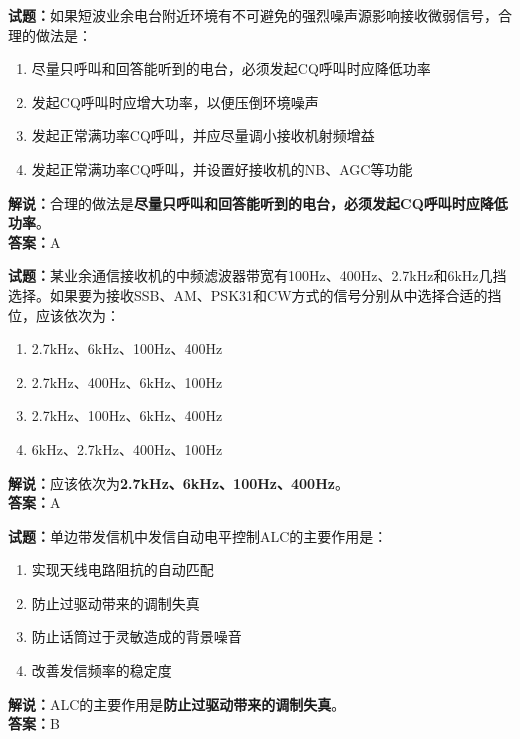 \documentclass{ctexbook}
\begin{document}
\vspace{1em}

\textbf{试题：}如果短波业余电台附近环境有不可避免的强烈噪声源影响接收微弱信号，合理的做法是：
\begin{enumerate}[leftmargin=3em]
  \item 尽量只呼叫和回答能听到的电台，必须发起CQ呼叫时应降低功率
  \item 发起CQ呼叫时应增大功率，以便压倒环境噪声
  \item 发起正常满功率CQ呼叫，并应尽量调小接收机射频增益
  \item 发起正常满功率CQ呼叫，并设置好接收机的NB、AGC等功能
\end{enumerate}
\noindent\textbf{解说：}合理的做法是\textbf{尽量只呼叫和回答能听到的电台，必须发起CQ呼叫时应降低功率}。\\\noindent\textbf{答案：}A

\vspace{1em}

\textbf{试题：}某业余通信接收机的中频滤波器带宽有100Hz、400Hz、2.7\unit{\kHz}和6\unit{\kHz}几挡选择。如果要为接收SSB、AM、PSK31和CW方式的信号分别从中选择合适的挡位，应该依次为：
\begin{enumerate}[leftmargin=3em]
  \item 2.7\unit{\kHz}、6\unit{\kHz}、100Hz、400Hz
  \item 2.7\unit{\kHz}、400Hz、6\unit{\kHz}、100Hz
  \item 2.7\unit{\kHz}、100Hz、6\unit{\kHz}、400Hz
  \item 6\unit{\kHz}、2.7\unit{\kHz}、400Hz、100Hz
\end{enumerate}
\noindent\textbf{解说：}应该依次为\textbf{2.7\unit{\kHz}、6\unit{\kHz}、100Hz、400Hz}。\\\noindent\textbf{答案：}A

\vspace{1em}

\textbf{试题：}单边带发信机中发信自动电平控制ALC的主要作用是：
\begin{enumerate}[leftmargin=3em]
  \item 实现天线电路阻抗的自动匹配
  \item 防止过驱动带来的调制失真
  \item 防止话筒过于灵敏造成的背景噪音
  \item 改善发信频率的稳定度
\end{enumerate}
\noindent\textbf{解说：}ALC的主要作用是\textbf{防止过驱动带来的调制失真}。\\\noindent\textbf{答案：}B
\end{document}
